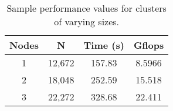 \begin{table}[h]
\centering
\begin{tabular}{@{}c|ccc@{}}
\toprule
\textbf{Nodes} & \textbf{N} & \textbf{Time (s)} & \textbf{Gflops} \\ \midrule
1              & 12,672     & 157.83            & 8.5966          \\
2              & 18,048     & 252.59            & 15.518          \\
3              & 22,272     & 328.68            & 22.411          \\ \bottomrule
\end{tabular}
\caption{Sample performance values for clusters of varying sizes.}
\label{tab:hpl-gflops}
\end{table}